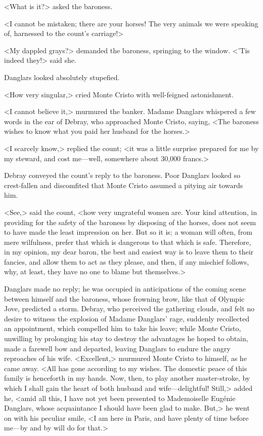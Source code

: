  <What is it?> asked the baroness. 

 <I cannot be mistaken; there are your horses! The very animals we were speaking of, harnessed to the count's carriage!> 

 <My dappled grays?> demanded the baroness, springing to the window. <'Tis indeed they!> said she. 

 Danglars looked absolutely stupefied. 

 <How very singular,> cried Monte Cristo with well-feigned astonishment. 

 <I cannot believe it,> murmured the banker. Madame Danglars whispered a few words in the ear of Debray, who approached Monte Cristo, saying, <The baroness wishes to know what you paid her husband for the horses.> 

 <I scarcely know,> replied the count; <it was a little surprise prepared for me by my steward, and cost me—well, somewhere about 30,000 francs.> 

 Debray conveyed the count's reply to the baroness. Poor Danglars looked so crest-fallen and discomfited that Monte Cristo assumed a pitying air towards him. 

 <See,> said the count, <how very ungrateful women are. Your kind attention, in providing for the safety of the baroness by disposing of the horses, does not seem to have made the least impression on her. But so it is; a woman will often, from mere wilfulness, prefer that which is dangerous to that which is safe. Therefore, in my opinion, my dear baron, the best and easiest way is to leave them to their fancies, and allow them to act as they please, and then, if any mischief follows, why, at least, they have no one to blame but themselves.> 

 Danglars made no reply; he was occupied in anticipations of the coming scene between himself and the baroness, whose frowning brow, like that of Olympic Jove, predicted a storm. Debray, who perceived the gathering clouds, and felt no desire to witness the explosion of Madame Danglars' rage, suddenly recollected an appointment, which compelled him to take his leave; while Monte Cristo, unwilling by prolonging his stay to destroy the advantages he hoped to obtain, made a farewell bow and departed, leaving Danglars to endure the angry reproaches of his wife.  <Excellent,> murmured Monte Cristo to himself, as he came away. <All has gone according to my wishes. The domestic peace of this family is henceforth in my hands. Now, then, to play another master-stroke, by which I shall gain the heart of both husband and wife—delightful! Still,> added he, <amid all this, I have not yet been presented to Mademoiselle Eugénie Danglars, whose acquaintance I should have been glad to make. But,> he went on with his peculiar smile, <I am here in Paris, and have plenty of time before me—by and by will do for that.> 

